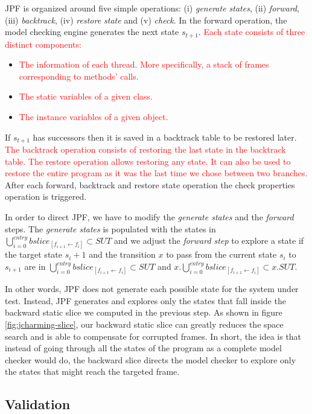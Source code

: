\documentclass[times, doublespace]{smrauth}
\newcommand{\red}[1]{\textcolor{red}{#1}}
\begin{document}
{JPF is organized around five simple
operations: (i) {\it generate states}, (ii) {\it forward}, (iii) {\it backtrack},
(iv) {\it restore state} and (v) {\it check}.
In the forward operation, the
model checking engine generates the next state $s_{t+1}$.
\red{Each state consists of three distinct components: }
\begin{itemize}
  \item \red{The information of each thread. More specifically, a stack of frames corresponding to methods' calls.}
  \item \red{The static variables of a given class.}
  \item \red{The instance variables of a given object.}
\end{itemize}
If $s_{t+1}$ has successors then it is saved in a backtrack table to be
restored later. \red{The backtrack operation consists of restoring
the last state in the backtrack table. The restore operation
allows restoring any state. It can also be used to restore the entire
program as it was the last time we chose between two
branches.} After each forward, backtrack and restore state
operation the check properties operation is triggered.

In order to direct JPF, we have to modify the {\it generate states}
and the {\it forward} steps. The {\it generate states} is populated with
the states in $\bigcup_{i=0}^{entry} bslice_{[f_{i+1} \leftarrow f_i]}  \subset SUT$ and we adjust the
{\it forward step} to explore a state if the target state $s_i+1$ and the
transition $x$ to pass from the current state $s_i$ to $s_{i+1}$ are in
$\bigcup_{i=0}^{entry} bslice_{[f_{i+1} \leftarrow f_i]}  \subset SUT$ and $x.\bigcup_{i=0}^{entry} bslice_{[f_{i+1} \leftarrow f_i]}  \subset x.SUT$.

In other words, JPF does not generate each possible state for the system under test.
Instead, JPF generates and explores only the states that fall inside the backward static
slice we computed in the previous step.
As shown in figure \ref{fig:jcharming-slice}, our backward static slice can
greatly reduces the space search and is able to compensate for corrupted frames.
In short, the idea is that instead of going through all the states of the program as a
complete model checker would do, the backward slice directs the model checker to explore
only the states that might reach the targeted frame.

\subsection{Validation}

}
\end{document}

